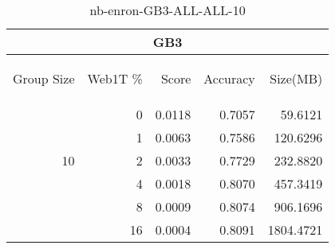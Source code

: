 \begin{center}
\begin{table}[htbp]
\begin{tabular}{ | r | r | r | r | r |}
\hline
\multicolumn{5}{|c|}{GB3}\\
\hline
\begin{sideways}Group Size\end{sideways} & \begin{sideways}Web1T \%\end{sideways} & \begin{sideways}Score\end{sideways} & \begin{sideways}Accuracy\end{sideways} & \begin{sideways}Size(MB)\end{sideways}\\
\hline
\multirow{5}{*}{10}
 & 0 & 0.0118 & 0.7057 & 59.6121\\ \cline{2-5}
 & 1 & 0.0063 & 0.7586 & 120.6296\\ \cline{2-5}
 & 2 & 0.0033 & 0.7729 & 232.8820\\ \cline{2-5}
 & 4 & 0.0018 & 0.8070 & 457.3419\\ \cline{2-5}
 & 8 & 0.0009 & 0.8074 & 906.1696\\ \cline{2-5}
 & 16 & 0.0004 & 0.8091 & 1804.4721\\ \cline{2-5}
\hline
\end{tabular}
\caption{nb-enron-GB3-ALL-ALL-10}
\label{table:nb-enron-GB3-ALL-ALL-10}
\end{table}
\end{center}

